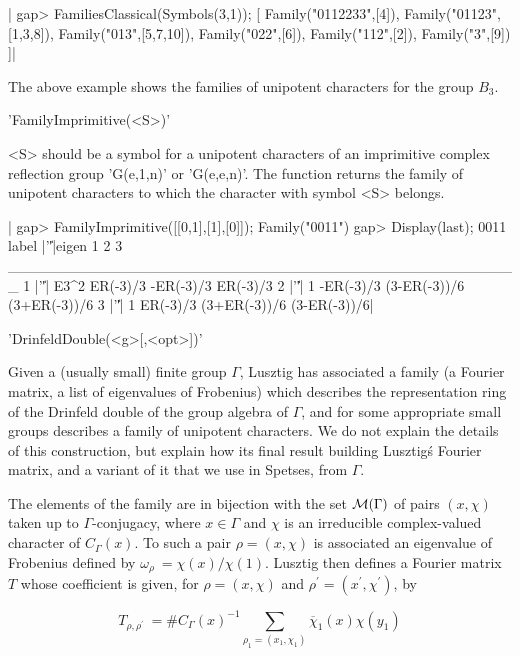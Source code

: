 |    gap> FamiliesClassical(Symbols(3,1));
    [ Family("0112233",[4]), Family("01123",[1,3,8]),
      Family("013",[5,7,10]), Family("022",[6]), Family("112",[2]),
      Family("3",[9]) ]|

The  above example shows the families of unipotent characters for the group
$B_3$.


'FamilyImprimitive(<S>)'

<S> should be a symbol for a unipotent characters of an imprimitive complex
reflection  group 'G(e,1,n)' or 'G(e,e,n)'. The function returns the family
of unipotent characters to which the character with symbol <S> belongs.

|    gap> FamilyImprimitive([[0,1],[1],[0]]);
    Family("0011")
    gap> Display(last);
    0011
    label |'\|'|eigen         1            2            3
    _________________________________________________
    1     |'\|'| E3^2  ER(-3)/3    -ER(-3)/3     ER(-3)/3
    2     |'\|'|    1 -ER(-3)/3 (3-ER(-3))/6 (3+ER(-3))/6
    3     |'\|'|    1  ER(-3)/3 (3+ER(-3))/6 (3-ER(-3))/6|


'DrinfeldDouble(<g>[,<opt>])'

Given  a (usually  small) finite  group $\Gamma$,  Lusztig has associated a
family  (a  Fourier  matrix,  a  list  of  eigenvalues  of Frobenius) which
describes  the  representation  ring  of  the  Drinfeld double of the group
algebra  of $\Gamma$,  and for  some appropriate  small groups  describes a
family  of  unipotent  characters.  We  do  not explain the details of this
construction,  but explain how its final result building Lusztig\'s Fourier
matrix, and a variant of it that we use in Spetses, from $\Gamma$.

The elements of the family are in bijection with the set ${\cal M}(\Gamma)$
of  pairs $(x,\chi)$ taken up to $\Gamma$-conjugacy, where $x\in\Gamma$ and
$\chi$ is an irreducible complex-valued character of $C_\Gamma(x)$. To such
a  pair $\rho=(x,\chi)$ is associated an eigenvalue of Frobenius defined by
$\omega_\rho\:=\chi(x)/\chi(1)$.  Lusztig then defines a Fourier matrix $T$
whose coefficient is given, for $\rho=(x,\chi)$ and $\rho^\prime=(x^\prime,
\chi^\prime)$, by\:

$$T_{\rho,\rho^\prime}\:=\#C_\Gamma(x)^{-1}
\sum_{\rho_1=(x_1,\chi_1)}\overline\chi_1(x)\chi(y_1)$$


